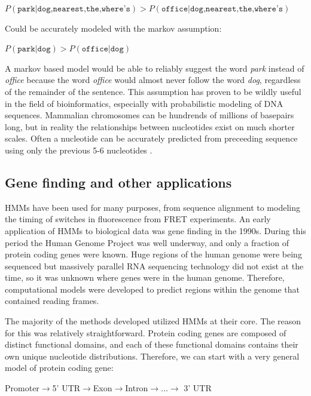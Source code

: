 \begin{center}
    $P(\texttt{park} | \texttt{dog,nearest,the,where's}) > P(\texttt{office} | \texttt{dog,nearest,the,where's}) $
\end{center}

Could be accurately modeled with the markov assumption:

\begin{center}
    $P(\texttt{park} | \texttt{dog}) > P(\texttt{office} | \texttt{dog}) $
\end{center}

A markov based model would be able to reliably suggest the word \emph{park} instead of \emph{office} because the word \emph{office} would almost never follow the word \emph{dog}, regardless of the remainder of the sentence. This assumption has proven to be wildly useful in the field of bioinformatics, especially with probabilistic modeling of DNA sequences. Mammalian chromosomes can be hundrends of millions of basepairs long, but in reality the relationships between nucleotides exist on much shorter scales. Often a nucleotide can be accurately predicted from preceeding sequence using only the previous 5-6 nucleotides \cite{Burge1997PredictionDNA}.

\subsection{Gene finding and other applications}
HMMs have been used for many purposes, from sequence alignment to modeling the timing of switches in fluorescence from FRET experiments. An early application of HMMs to biological data was gene finding in the 1990s. During this period the Human Genome Project was well underway, and only a fraction of protein coding genes were known. Huge regions of the human genome were being sequenced but massively parallel RNA sequencing technology did not exist at the time, so it was unknown where genes were in the human genome. Therefore, computational models were developed to predict regions within the genome that contained reading frames. 

The majority of the methods developed utilized HMMs at their core. The reason for this was relatively straightforward. Protein coding genes are composed of distinct functional domains, and each of these functional domains contains their own unique nucleotide distributions. Therefore, we can start with a very general model of protein coding gene:

\begin{center}
    Promoter$\rightarrow$5' UTR$\rightarrow$Exon$\rightarrow$Intron$\rightarrow \dots \rightarrow$ 3' UTR
\end{center}

